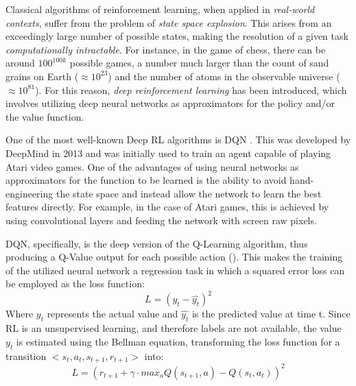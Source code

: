 \documentclass[12pt,a4paper,openright,twoside]{book}
\begin{document}
Classical algorithms of reinforcement learning, when applied in \emph{real-world contexts}, suffer from the problem of \emph{state space explosion}.
    This arises from an exceedingly large number of possible states, making the resolution of a given task \emph{computationally intractable}. 
    For instance, in the game of chess, there can be around $100^{100k}$ possible games, a number much larger than 
    the count of sand grains on Earth ($\approx 10^{23}$) and the number of atoms in the observable universe 
    ($\approx 10^{81}$). 
    For this reason, \emph{deep reinforcement learning} has been introduced, which involves utilizing deep neural networks
    as approximators for the policy and/or the value function.

One of the most well-known Deep RL algorithms is DQN \cite{dqn}. This was developed by DeepMind in 2013 and was initially
    used to train an agent capable of playing Atari video games. One of the advantages of using neural networks as 
    approximators for the function to be learned is the ability to avoid hand-engineering the state space and instead 
    allow the network to learn the best features directly. For example, in the case of Atari games, this is achieved 
    by using convolutional layers and feeding the network with screen raw pixels.
    
DQN, specifically, is the deep version of the Q-Learning algorithm, thus producing a Q-Value output for each 
    possible action (). This makes the training of the utilized neural network a regression task 
    in which a squared error loss can be employed as the loss function:
    $$ L = (y_t - \hat{y_t})^2 $$
    Where $y_t$ represents the actual value and $\hat{y_t}$ is the predicted value at time t. Since RL is an 
    unsupervised learning, and therefore labels are not available, the value $y_t$ is estimated using the 
    Bellman equation, transforming the loss function for a transition $<s_t, a_t, s_{t+1}, r_{t+1}>$ into:
    $$ L = ( r_{t+1} + \gamma \cdot max_a Q(s_{t+1}, a) - Q(s_t, a_t))^2 $$
\end{document}

